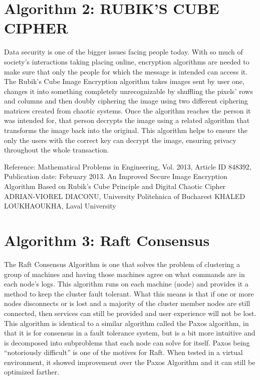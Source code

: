 \documentclass[11pt]{article}
\begin{document}
\section{Algorithm 2: RUBIK'S CUBE CIPHER}
Data security is one of the bigger issues facing people today. With so much of society's interactions taking placing online, encryption algorithms are needed to make sure that only the people for which the message is intended can access it. The Rubik's Cube Image Encryption algorithm takes images sent by user one, changes it into something completely unrecognizable by shuffling the pixels' rows and columns and then doubly ciphering the image using two different ciphering matrices created from chaotic systems. Once the algorithm reaches the person it was intended for, that person decrypts the image using a related algorithm that transforms the image back into the original. This algorithm helps to ensure the only the users with the correct key can decrypt the image, ensuring privacy throughout the whole transaction. 

Reference: Mathematical Problems in Engineering, Vol. 2013, Article ID 848392, Publication date: February 2013. An Improved Secure Image Encryption Algorithm Based on Rubik's Cube Principle and Digital Chaotic Cipher
ADRIAN-VIOREL DIACONU, University Politehnica of Bucharest
KHALED LOUKHAOUKHA, Laval University

\section{Algorithm 3: Raft Consensus}
The Raft Consensus Algorithm is one that solves the problem of clustering a group of machines and having those machines agree on what commands are in each node's logs. This algorithm runs on each machine (node) and provides it a method to keep the cluster fault tolerant. What this means is that if one or more nodes disconnects or is lost and a majority of the cluster member nodes are still connected, then services can still be provided and user experience will not be lost. This algorithm is identical to a similar algorithm called the Paxos algorithm, in that it is for consensus in a fault tolerance system, but is a bit more intuitive and is decomposed into subproblems that each node can solve for itself. Paxos being “notoriously difficult” is one of the motives for Raft. When tested in a virtual environment, it showed improvement over the Paxos Algorithm and it can still be optimized farther.
\end{document}
